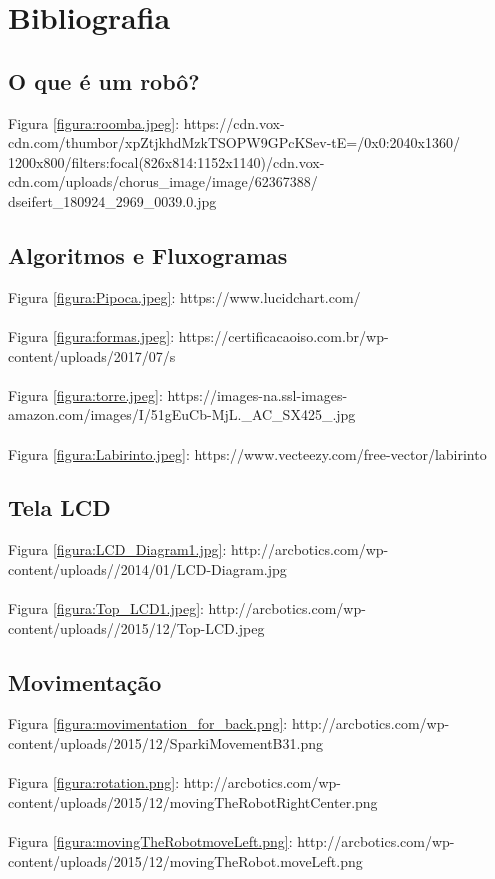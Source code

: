 \chapter*{Bibliografia}

\section*{O que é um robô?}

\noindent Figura \ref{figura:roomba.jpeg}: https://cdn.vox-cdn.com/thumbor/xpZtjkhdMzkTSOPW9GPcKSev-tE=/0x0:2040x1360/\\1200x800/filters:focal(826x814:1152x1140)/cdn.vox-cdn.com/uploads/chorus\_image/image/62367388/\\dseifert\_180924\_2969\_0039.0.jpg

\section*{Algoritmos e Fluxogramas}

\noindent Figura \ref{figura:Pipoca.jpeg}: https://www.lucidchart.com/
\\~\\
Figura \ref{figura:formas.jpeg}: https://certificacaoiso.com.br/wp-content/uploads/2017/07/s%
\\~\\
Figura \ref{figura:torre.jpeg}: https://images-na.ssl-images-amazon.com/images/I/51gEuCb-MjL.\_AC\_SX425\_.jpg
\\~\\
Figura \ref{figura:Labirinto.jpeg}: https://www.vecteezy.com/free-vector/labirinto

\section*{Tela LCD}

\noindent Figura \ref{figura:LCD_Diagram1.jpg}: http://arcbotics.com/wp-content/uploads//2014/01/LCD-Diagram.jpg
\\~\\
Figura \ref{figura:Top_LCD1.jpeg}: http://arcbotics.com/wp-content/uploads//2015/12/Top-LCD.jpeg

\section*{Movimentação}

\noindent Figura \ref{figura:movimentation_for_back.png}: http://arcbotics.com/wp-content/uploads/2015/12/SparkiMovementB31.png
\\~\\
Figura \ref{figura:rotation.png}: http://arcbotics.com/wp-content/uploads/2015/12/movingTheRobotRightCenter.png
\\~\\
Figura \ref{figura:movingTheRobotmoveLeft.png}: http://arcbotics.com/wp-content/uploads/2015/12/movingTheRobot.moveLeft.png

